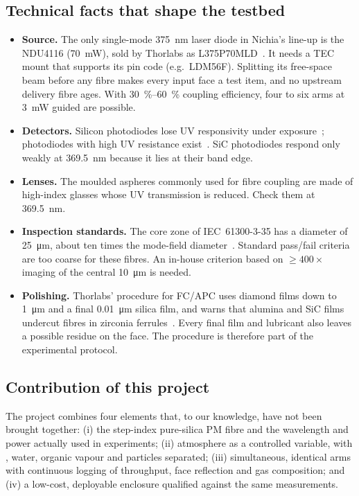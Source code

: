 \subsection{Technical facts that shape the testbed}\label{sec:sota-hardware}
\begin{itemize}
  \item \textbf{Source.} The only single-mode \SI{375}{nm} laser diode in Nichia's line-up is the
        NDU4116 (\SI{70}{mW}), sold by Thorlabs as L375P70MLD~\cite{ThorlabsL375}. It needs a TEC
        mount that supports its pin code (e.g.\ LDM56F). Splitting its free-space beam before any fibre
        makes every input face a test item, and no upstream delivery fibre ages. With \SIrange{30}{60}{\percent}
        coupling efficiency, four to six arms at \SI{3}{mW} guided are possible.
  \item \textbf{Detectors.} Silicon photodiodes lose UV responsivity under exposure~\cite{Korde1987,Siles2024};
        photodiodes with high UV resistance exist~\cite{HamamatsuS12698}. SiC photodiodes respond only weakly
        at \SI{369.5}{nm} because it lies at their band edge.
  \item \textbf{Lenses.} The moulded aspheres commonly used for fibre coupling are made of high-index
        glasses whose UV transmission is reduced. Check them at \SI{369.5}{nm}.
  \item \textbf{Inspection standards.} The core zone of IEC~61300-3-35 has a diameter of
        \SI{25}{\micro m}, about ten times the mode-field diameter~\cite{IEC61300335}. Standard
        pass/fail criteria are too coarse for these fibres. An in-house criterion based on
        $\geq400\times$ imaging of the central \SI{10}{\micro m} is needed.
  \item \textbf{Polishing.} Thorlabs' procedure for FC/APC uses diamond films down to \SI{1}{\micro m}
        and a final \SI{0.01}{\micro m} silica film, and warns that alumina and SiC films undercut fibres
        in zirconia ferrules~\cite{ThorlabsPolish}. Every final film and lubricant also leaves a
        possible residue on the face. The procedure is therefore part of the experimental protocol.
\end{itemize}

\subsection{Contribution of this project}
The project combines four elements that, to our knowledge, have not been brought together:
(i) the step-index pure-silica PM fibre and the wavelength and power actually used in \Ybion{}
experiments; (ii) atmosphere as a controlled variable, with \Oxy, water, organic vapour and particles
separated; (iii) simultaneous, identical arms with continuous logging of throughput, face reflection and
gas composition; and (iv) a low-cost, deployable enclosure qualified against the same measurements.
